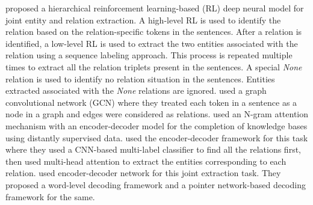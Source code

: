  proposed a hierarchical reinforcement learning-based (RL) deep neural model for joint entity and relation extraction. A high-level RL is used to identify the relation based on the relation-specific tokens in the sentences. After a relation is identified, a low-level RL is used to extract the two entities associated with the relation using a sequence labeling approach. This process is repeated multiple times to extract all the relation triplets present in the sentences. A special {\em None} relation is used to identify no relation situation in the sentences. Entities extracted associated with the {\em None} relations are ignored.  used a graph convolutional network (GCN) where they treated each token in a sentence as a node in a graph and edges were considered as relations.  used an N-gram attention mechanism with an encoder-decoder model for the completion of knowledge bases using distantly supervised data.  used the encoder-decoder framework for this task where they used a CNN-based multi-label classifier to find all the relations first, then used multi-head attention  to extract the entities corresponding to each relation.  used encoder-decoder network for this joint extraction task. They proposed a word-level decoding framework and a pointer network-based decoding framework for the same. 
